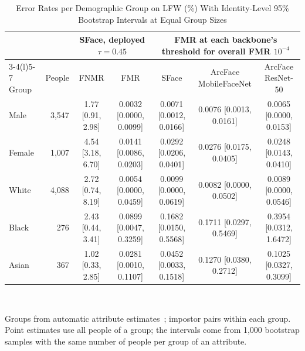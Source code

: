 \documentclass{ieeeaccess}
\begin{document}
\begin{table}[!t]
\centering
\caption{Error Rates per Demographic Group on LFW (\%) With Identity-Level 95\% Bootstrap Intervals at Equal Group Sizes}
\label{tab:demo}
\footnotesize
\setlength{\tabcolsep}{4pt}
\begin{tabular}{@{}lrccccc@{}}
\toprule
 & & \multicolumn{2}{c}{SFace, deployed $\tau=0.45$} & \multicolumn{3}{c}{FMR at each backbone's threshold for overall FMR $10^{-4}$} \\
\cmidrule(lr){3-4}\cmidrule(l){5-7}
Group & People & FNMR & FMR & SFace & ArcFace MobileFaceNet & ArcFace ResNet-50 \\
\midrule
Male & 3,547 & 1.77 [0.91, 2.98] & 0.0032 [0.0000, 0.0099] & 0.0071 [0.0012, 0.0166] & 0.0076 [0.0013, 0.0161] & 0.0065 [0.0000, 0.0153] \\
Female & 1,007 & 4.54 [3.18, 6.70] & 0.0141 [0.0086, 0.0203] & 0.0292 [0.0206, 0.0401] & 0.0276 [0.0175, 0.0405] & 0.0248 [0.0143, 0.0410] \\
\midrule
White & 4,088 & 2.72 [0.74, 8.19] & 0.0054 [0.0000, 0.0459] & 0.0099 [0.0000, 0.0619] & 0.0082 [0.0000, 0.0502] & 0.0089 [0.0000, 0.0546] \\
Black & 276 & 2.43 [0.44, 3.41] & 0.0899 [0.0047, 0.3259] & 0.1682 [0.0150, 0.5568] & 0.1711 [0.0297, 0.5469] & 0.3954 [0.0312, 1.6472] \\
Asian & 367 & 1.02 [0.33, 2.85] & 0.0281 [0.0010, 0.1107] & 0.0452 [0.0033, 0.1518] & 0.1270 [0.0380, 0.2712] & 0.1025 [0.0327, 0.3099] \\

\bottomrule
\end{tabular}\\[2pt]
\raggedright\scriptsize Groups from automatic attribute estimates~\cite{kumar2011attributes}; impostor pairs within each group. Point estimates use all people of a group; the intervals come from 1,000 bootstrap samples with the same number of people per group of an attribute.
\end{table}
\end{document}
